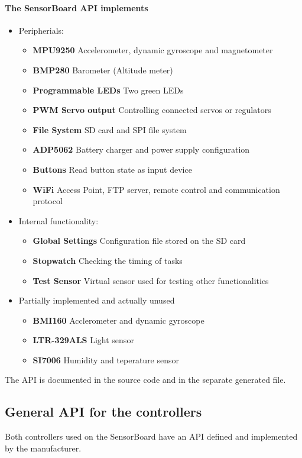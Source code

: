 \newpage
\paragraph{The SensorBoard \ac{API} implements}
\begin{itemize}
	\item Peripherials:
	\begin{itemize}
		\item \textbf{MPU9250} Accelerometer, dynamic gyroscope and magnetometer
		\item \textbf{BMP280} Barometer (Altitude meter)
		\item \textbf{Programmable LEDs} Two green LEDs
		\item \textbf{PWM Servo output} Controlling connected servos or regulators
		\item \textbf{File System} SD card and SPI file system
		\item \textbf{ADP5062} Battery charger and power supply configuration
		\item \textbf{Buttons} Read button state as input device
		\item \textbf{WiFi} Access Point, FTP server, remote control and communication protocol
	\end{itemize}
	\item Internal functionality:
	\begin{itemize}
		\item \textbf{Global Settings} Configuration file stored on the SD card
		\item \textbf{Stopwatch} Checking the timing of tasks
		\item \textbf{Test Sensor} Virtual sensor used for testing other functionalities
	\end{itemize}
	\item Partially implemented and actually unused
	\begin{itemize}
		\item \textbf{BMI160} Acclerometer and dynamic gyroscope
		\item \textbf{LTR-329ALS} Light sensor
		\item \textbf{SI7006} Humidity and teperature sensor
	\end{itemize}
\end{itemize}

The \ac{API} is documented in the source code and in the separate generated file.

\subsection{General \ac{API} for the controllers}
\label{GeneralAPI}
Both controllers used on the SensorBoard have an \ac{API} defined and implemented by the manufacturer.

